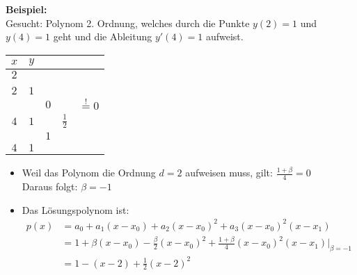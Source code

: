 \textbf{Beispiel:}\\
Gesucht: Polynom 2. Ordnung, welches durch die Punkte $y(2)=1$ und $y(4)=1$ geht und die Ableitung $y'(4)=1$ aufweist.

\begin{minipage}[c]{6cm}
	\renewcommand{\arraystretch}{1.0}
	\begin{tabular}{|c|llll|}
		\hline
		$x$	&\multicolumn{4}{l|}{$y$}\\
		\hline
		$2$	&\kreisS{$1$}{$a_0$}&	&&\\
			&	&\kreisS{$\beta$}{$a_1$}&&\\
		$2$	&$1$&	&\kreisB{$-\frac \beta2$}{$a_2$}&\\
			&	&$0$&				  &\kreisB{$\frac{1+\beta}{4}$}{$a_3$}$\overset{!}{=}0$\\
		$4$	&$1$&	&$\frac 12$&\\
			&	&$1$&&\\
		$4$	&$1$&	&&\\
		\hline
	\end{tabular}
	\renewcommand{\arraystretch}{1.5}
\end{minipage}
\hfill
\begin{minipage}[c]{12cm}

	\vspace{0.5cm}

	\begin{itemize}
		\item Weil das Polynom die Ordnung $d=2$ aufweisen muss, gilt: $\frac{1+\beta}4=0$\\
		Daraus folgt: $\beta=-1$
		\item Das Lösungspolynom ist:
		\begin{align} p(x)&=a_0+a_1(x-x_0)+a_2(x-x_0)^2+a_3(x-x_0)^2(x-x_1)\nonumber\\
		&=1+\beta(x-x_0)-\frac \beta2(x-x_0)^2+\frac{1+\beta}4(x-x_0)^2(x-x_1)\big|_{\beta=-1}\nonumber\\
		&=1-(x-2)+\frac 12(x-2)^2\nonumber
		\end{align}
	\end{itemize}
\end{minipage}

\vfill
